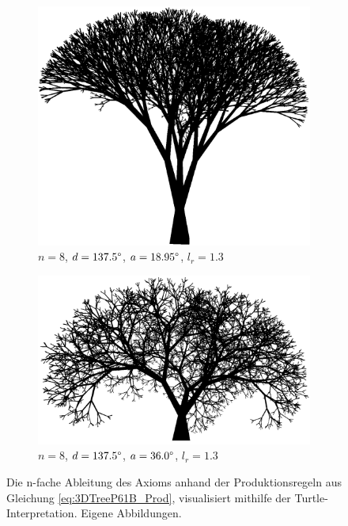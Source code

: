 	\cite[S.60]{ABOP:04} 
\begin{figure} [hbtp]
	\centering
	\begin{subfigure}[t]{.7\textwidth}
		\centering
		\includegraphics[width=\linewidth]{images/3DTreeP61B_Angle_18_95.png}
		\caption{$n=8$, $d=137.5\degree$, $a=18.95\degree$, $l_r=1.3$}
		\label{subfig:3DTreeP61B_Angle_18_95}
	\end{subfigure}
	\begin{subfigure}[t]{.7\textwidth}
		\centering
		\includegraphics[width=\linewidth]{images/3DTreeP61B_Angle_36.png}
		\caption{$n=8$, $d=137.5\degree$, $a=36.0\degree$, $l_r=1.3$}
		\label{subfig:3DTreeP61B_Angle_36}
	\end{subfigure}
	\caption{Die n-fache Ableitung des Axioms anhand der Produktionsregeln aus Gleichung \ref{eq:3DTreeP61B_Prod}, visualisiert mithilfe der Turtle-Interpretation. Eigene Abbildungen.}
	\label{fig:BranchingLSystems3D}
\end{figure}


